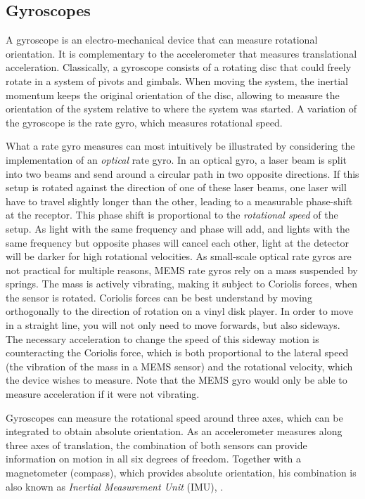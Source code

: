 \subsection{Gyroscopes}
A gyroscope is an electro-mechanical device that can measure rotational orientation. It is complementary to the accelerometer that measures translational acceleration. Classically, a gyroscope consists of a rotating disc that could freely rotate in a system of pivots and gimbals. When moving the system, the inertial momentum keeps the original orientation of the disc, allowing to measure the orientation of the system relative to where the system was started. A variation of the gyroscope is the rate gyro, which measures rotational speed. 

What a rate gyro  measures can most intuitively be illustrated by considering the implementation of an \emph{optical} rate gyro. In an optical gyro, a laser beam is split into two beams and send around a circular path in two opposite directions. If this setup is rotated against the direction of one of these laser beams, one laser will have to travel slightly longer than the other, leading to a measurable phase-shift at the receptor. This phase shift is proportional to the \emph{rotational speed} of the setup. As light with the same frequency and phase will add, and lights with the same frequency but opposite phases will cancel each other, light at the detector will be darker for high rotational velocities. As small-scale optical rate gyros are not practical for multiple reasons, MEMS rate gyros rely on a mass suspended by springs. The mass is actively vibrating, making it subject to Coriolis forces, when the sensor is rotated. Coriolis forces can be best understand by moving orthogonally to the direction of rotation on a vinyl disk player. In order to move in a straight line, you will not only need to move forwards, but also sideways. The necessary acceleration to change the speed of this sideway motion is counteracting the Coriolis force, which is both proportional to the lateral speed (the vibration of the mass in a MEMS sensor) and the rotational velocity, which the device wishes to measure. Note that the MEMS gyro would only be able to measure acceleration if it were not vibrating.

Gyroscopes can measure the rotational speed around three axes, which can be integrated to obtain absolute orientation. As an accelerometer measures along three axes of translation, the combination of both sensors can provide information on motion in all six degrees of freedom. Together with a magnetometer (compass), which provides absolute orientation, his combination is also known as \emph{Inertial Measurement Unit} (IMU), .

